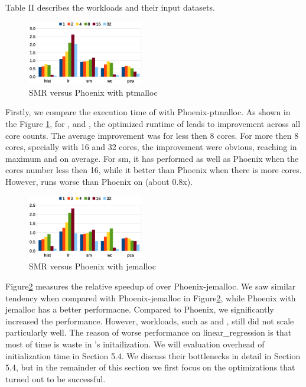 Table II describes the workloads and their input datasets. 
\begin{figure}[!h!t]  
	\centering
	\includegraphics[width=0.45\textwidth]{eps/dmr_time_array.eps}
	\caption{SMR versus Phoenix with ptmalloc}
	\label{fig:smr:time:ptmalloc}
\end{figure}


Firstly, we compare the execution time of \myds with Phoenix-ptmalloc. 
As shown in the Figure \ref{fig:smr:time:ptmalloc}, for ,  and , the optimized runtime of \myds leads to improvement across all core counts.
The average improvement was  for less then 8 cores.
For more then 8 cores, specially with 16 and 32 cores, the improvement were obvious, reaching  in maximum and  on average.
For sm, it has performed as well as Phoenix when the cores number less then 16, while it better than Phoenix when there is more cores.
However, \myds runs worse than Phoenix on  (about 0.8x).
\begin{figure}[!h!t]  
	\centering
	\includegraphics[width=0.45\textwidth]{eps/dmr_time_jemalloc.eps}
	\caption{SMR versus Phoenix with jemalloc}
	\label{fig:smr:time:jemalloc}
\end{figure}

Figure\ref{fig:smr:time:jemalloc} measures the relative speedup of \myds over Phoenix-jemalloc. 
We saw similar tendency when compared with Phoenix-jemalloc in Figure\ref{fig:smr:time:jemalloc}, while Phoenix with jemalloc has a better performacne.
Compared to Phoenix, we significantly increased the performance.
However, workloads, such as  and , still did not scale particularly well. 
The reason of worse performance on linear\_regression is that most of time is waste in \myds's initailization.
We will evaluation overhead of initialization time in Section 5.4.
We discuss their bottlenecks in detail in Section 5.4, but in the remainder of this section we first focus on the optimizations that turned out to be successful.

